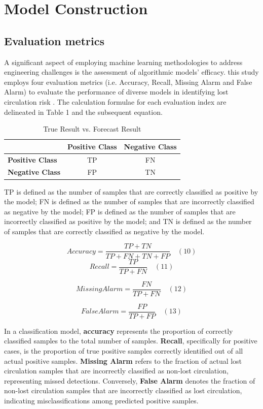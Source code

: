 \documentclass[journal,article,submit,pdftex,moreauthors]{Definitions/mdpi}
\begin{document}
\section{Model Construction}
\subsection{Evaluation metrics}

A significant aspect of employing machine learning methodologies to address engineering challenges is the assessment of algorithmic models' efficacy. this study employs four evaluation metrics (i.e. Accuracy, Recall, Missing Alarm and False Alarm\cite{SunW2023}) to evaluate the performance of diverse models in identifying lost circulation risk \cite{ZZY2024}. The calculation formulae for each evaluation index are delineated in Table 1 and the subsequent equation.

\begin{table}[h]
\centering
\begin{tabular}{lcc}
\hline
                      & \textbf{Positive Class} & \textbf{Negative Class} \\ \hline
\textbf{Positive Class} & TP                      & FN                      \\
\textbf{Negative Class} & FP                      & TN                      \\ \hline
\end{tabular}
\caption{True Result vs. Forecast Result}
\label{True Result vs. Forecast Result}
\end{table}
TP is defined as the number of samples that are correctly classified as positive by the model;
FN is defined as the number of samples that are incorrectly classified as negative by the model;
FP is defined as the number of samples that are incorrectly classified as positive by the model; and
TN is defined as the number of samples that are correctly classified as negative by the model.

$$ A c c u r a c y = \frac { T P + T N } { T P + F N + T N + F P }\quad (10)$$
$$ R e c a l l = \frac { T P } { T P + F N } \quad (11)$$

$$ M i s sin g A l a r m = \frac { F N } { T P + F N } \quad (12)$$

$$ F a l s e A l a r m = \frac { F P } { T P + F P } \quad (13)$$

In a classification model, \textbf{accuracy} represents the proportion of correctly classified samples to the total number of samples. \textbf{Recall}, specifically for positive cases, is the proportion of true positive samples correctly identified out of all actual positive samples. \textbf{Missing Alarm} refers to the fraction of actual lost circulation samples that are incorrectly classified as non-lost circulation, representing missed detections. Conversely, \textbf{False Alarm} denotes the fraction of non-lost circulation samples that are incorrectly classified as lost circulation, indicating misclassifications among predicted positive samples.
\end{document}
